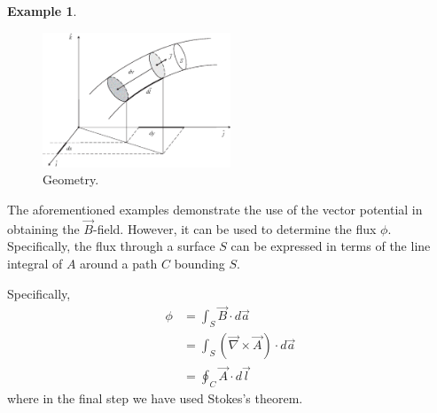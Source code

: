 \documentclass[11pt,a4paper,oneside]{book}
\numberwithin{equation}{section}
\theoremstyle{it}
\theoremstyle{definition}
\newtheorem{example}{Example}[section]
\begin{document}
\begin{example}
\begin{figure}[H]
	\centering
	\includegraphics[width = 0.5\textwidth, width = 250pt, angle = 0, keepaspectratio]{figures/morosi_620_4.eps}
	\captionsetup{width=0.75\textwidth}		
	\caption{Geometry.}
	\label{morosi_620_4}
\end{figure}
\end{example}

The aforementioned examples demonstrate the use of the vector potential in obtaining the $\vec{B}$-field. However, it can be used to determine the flux $\phi$. Specifically, the flux through a surface $S$ can be expressed in terms of the line integral of $A$ around a path $C$ bounding $S$. 

Specifically, 
\begin{equation}
\begin{aligned}
	\phi &= \int_{S}\vec{B}\cdot d\vec{a} \\[6pt]
	&= \int_{S}(\vec{\nabla}\times\vec{A})\cdot d\vec{a} \\[6pt] 
	&=\oint_{C}\vec{A}\cdot d\vec{l}
\end{aligned}
\end{equation}
where in the final step we have used Stokes's theorem.
\end{document}
